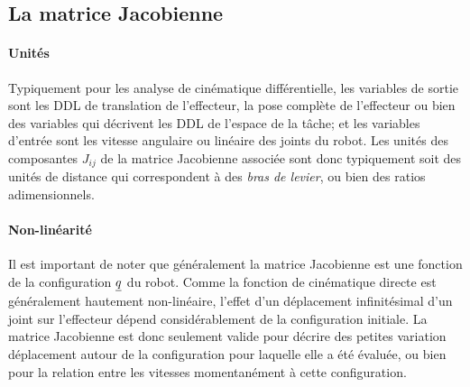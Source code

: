 
\subsection{La matrice Jacobienne}

\paragraph{Unités} Typiquement pour les analyse de cinématique différentielle, les variables de sortie sont les DDL de translation de l'effecteur, la pose complète de l'effecteur ou bien des variables qui décrivent les DDL de l'espace de la tâche; et les variables d'entrée sont les vitesse angulaire ou linéaire des joints du robot. Les unités des composantes $J_{ij}$ de la matrice Jacobienne associée sont donc typiquement soit des unités de distance qui correspondent à des \textit{bras de levier}, ou bien des ratios adimensionnels. 

\paragraph{Non-linéarité} Il est important de noter que généralement la matrice Jacobienne est une fonction de la configuration $\underline{q}$ du robot. Comme la fonction de cinématique directe est généralement hautement non-linéaire, l'effet d'un déplacement infinitésimal d'un joint sur l'effecteur dépend considérablement de la configuration initiale. La matrice Jacobienne est donc seulement valide pour décrire des petites variation déplacement autour de la configuration pour laquelle elle a été évaluée, ou bien pour la relation entre les vitesses momentanément à cette configuration. 


